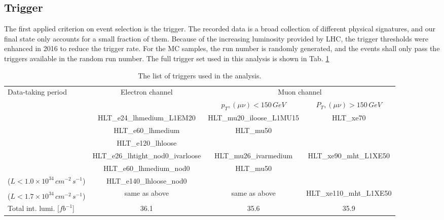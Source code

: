 \subsection{Trigger}
\label{Subsec:Trigger_resonance}
The first applied criterion on event selection is the trigger. The recorded data is a broad collection of different physical signatures, and our final state only accounts for a small fraction of them. Because of the increasing luminosity provided by LHC, the trigger thresholds were enhanced in 2016 to reduce the trigger rate. For the MC samples, the run number is randomly generated, and the events shall only pass the triggers available in the random run number. The full trigger set used in this analysis is shown in Tab. \ref{tab:triggers}
\begin{table}[h]
	\caption{The list of triggers used in the analysis.} \label{tab:triggers}
	
		\footnotesize
		\begin{center}
		\begin{adjustbox}{center}
			\begin{tabular}{|l|c|c|c|}
				\hline
				\multirow{2}{*}{Data-taking period} & \multirow{2}{*}{Electron channel} & \multicolumn{2}{c|}{ Muon channel }  \\
				\cline{3-4}
				& & $p_{T},\left(\mu\nu\right) < 150\,GeV$ & $P_{T},\left(\mu\nu\right) > 150\,GeV$   \\
				\hline
				\multirow{3}{*}{\centering {2015}} & HLT\_e24\_lhmedium\_L1EM20 & HLT\_mu20\_iloose\_L1MU15 & \multirow{3}{*}{ HLT\_xe70 } \\
				& HLT\_e60\_lhmedium  & HLT\_mu50 & \\
				& HLT\_e120\_lhloose & & \\
				\hline
				\multirow{2}{*}{\centering {2016a (run $< 302919$)}} & HLT\_e26\_lhtight\_nod0\_ivarloose & HLT\_mu26\_ivarmedium  & \multirow{3}{*}{ HLT\_xe90\_mht\_L1XE50 } \\
				& HLT\_e60\_lhmedium\_nod0 & HLT\_mu50 &  \\
				($L<1.0\times10^{34}\,{ cm}^{-2}\,{s}^{-1}$) & HLT\_e140\_lhloose\_nod0 & & \\
				\hline
				{\centering {2016b (run $\geq 302919$)}} & \multirow{2}{*}{same as above} & \multirow{2}{*}{same as above}  &  \multirow{2}{*}{HLT\_xe110\_mht\_L1XE50} \\
				($L<1.7\times10^{34}\,{ cm}^{-2}\,{ s}^{-1}$) & & &\\
				\hline
				\hline
				Total int. lumi. [$fb^{-1}$] &  36.1 & 35.6 & 35.9 \\
				\hline
			\end{tabular}
		\end{adjustbox}
		\end{center}
	
\end{table}
